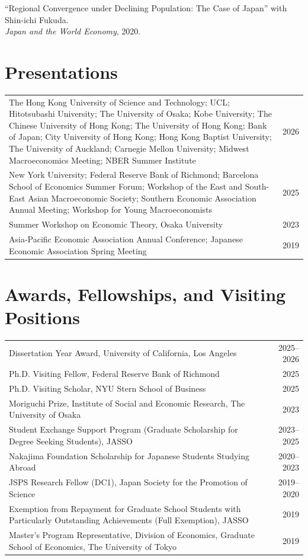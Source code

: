 \documentclass[11pt]{article}
\begin{document}
``Regional Convergence under Declining Population: The Case of Japan'' with Shin-ichi Fukuda.\\
{\it Japan and the World Economy}, 2020.

\section{Presentations}
\begin{tabularx}{\textwidth}{@{}>{\RaggedRight\arraybackslash}Xr@{}}
	The Hong Kong University of Science and Technology; UCL;
	Hitotsubashi University; The University of Osaka; Kobe University;
	The Chinese University of Hong Kong; The University of Hong Kong;
	Bank of Japan; City University of Hong Kong; Hong Kong Baptist University;
	The University of Auckland; Carnegie Mellon University; Midwest Macroeconomics Meeting; NBER Summer Institute& 2026 \\
	New York University; Federal Reserve Bank of Richmond;
	Barcelona School of Economics Summer Forum;
	Workshop of the East and South-East Asian Macroeconomic Society;
	Southern Economic Association Annual Meeting;
	Workshop for Young Macroeconomists & 2025 \\
	Summer Workshop on Economic Theory, Osaka University & 2023 \\
	Asia-Pacific Economic Association Annual Conference; Japanese Economic Association Spring Meeting & 2019 \\
\end{tabularx}

\section{Awards, Fellowships, and Visiting Positions}
\begin{tabularx}{\textwidth}{@{}>{\RaggedRight\arraybackslash}Xr@{}}
	Dissertation Year Award, University of California, Los Angeles & 2025--2026 \\
	Ph.D. Visiting Fellow, Federal Reserve Bank of Richmond & 2025 \\
	Ph.D. Visiting Scholar, NYU Stern School of Business & 2025 \\
	Moriguchi Prize, Institute of Social and Economic Research, The University of Osaka & 2023 \\
	Student Exchange Support Program (Graduate Scholarship for Degree Seeking Students), JASSO & 2023--2025 \\
	Nakajima Foundation Scholarship for Japanese Students Studying Abroad & 2020--2023 \\
	JSPS Research Fellow (DC1), Japan Society for the Promotion of Science & 2019--2020 \\
	Exemption from Repayment for Graduate School Students with Particularly
	Outstanding Achievements (Full Exemption), JASSO & 2019 \\
	Master's Program Representative,
	Division of Economics,
	Graduate School of Economics, The University of Tokyo
	& 2019 \\
\end{tabularx}
\end{document}
